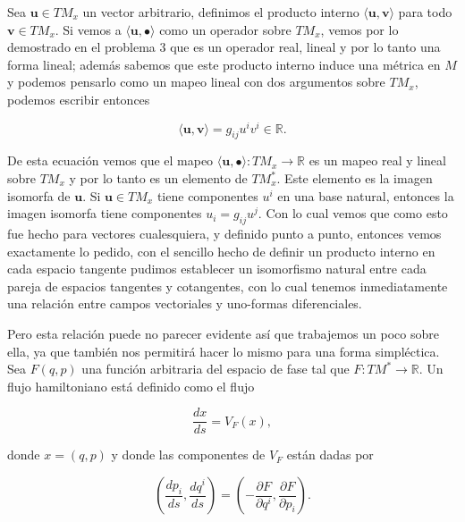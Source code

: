 \documentclass[a4paper,10pt]{article}
\numberwithin{equation}{section}
\begin{document}
\vspace{.3cm}

Sea $\mathbf{u} \in TM_x$ un vector arbitrario, definimos el producto interno 
$\langle \mathbf{u} , \mathbf{v} \rangle$ para todo $\mathbf{v} \in TM_x$. Si vemos 
a $\langle \mathbf{u} , \bullet \rangle$ como un operador sobre $TM_x$, vemos 
por lo demostrado en el problema 3 que es un operador real, lineal y por 
lo tanto una forma lineal; además sabemos que este producto interno induce 
una métrica en $M$ y podemos pensarlo como un mapeo lineal con dos argumentos 
sobre $TM_x$, podemos escribir entonces 

\begin{equation}
 \langle \mathbf{u} , \mathbf{v} \rangle = g_{ij}u^iv^i \in \mathbb{R}.
\end{equation}

De esta ecuación vemos que el mapeo $\langle \mathbf{u} , \bullet \rangle: TM_x 
\rightarrow \mathbb{R}$ es un mapeo real y lineal sobre $TM_x$ y por lo tanto 
es un elemento de $TM_x^*$. Este elemento es la imagen isomorfa de $\mathbf{u}$. 
Si $\mathbf{u} \in TM_x$ tiene componentes $u^i$ en una base natural, entonces 
la imagen isomorfa tiene componentes $u_i = g_{ij}u^j$. Con lo cual vemos que 
como esto fue hecho para vectores cualesquiera, y definido punto a punto, entonces 
vemos exactamente lo pedido, con el sencillo hecho de definir un producto interno 
en cada espacio tangente pudimos establecer un isomorfismo natural entre 
cada pareja de espacios tangentes y cotangentes, con lo cual tenemos inmediatamente 
una relación entre campos vectoriales y uno-formas diferenciales.

\vspace{.3cm}

Pero esta relación puede no parecer evidente así que trabajemos un poco sobre ella,
ya que también nos permitirá hacer lo mismo para una forma simpléctica. Sea $F(q,p)$ 
una función arbitraria del espacio de fase tal que $F: TM^* \rightarrow \mathbb{R}$. Un
flujo hamiltoniano está definido como el flujo 

\begin{equation}
 \frac{dx}{ds} = V_F(x),
 \label{eq:83}
\end{equation}

donde $x=(q,p)$ y donde las componentes de $V_F$ están dadas por 

\begin{equation}
 \left(\frac{dp_i}{ds}, \frac{dq^i}{ds}\right) = 
 \left(- \frac{\partial F}{\partial q^i}, \frac{\partial F}{\partial p_i}\right).
 \label{eq:82}
\end{equation}
\end{document}
